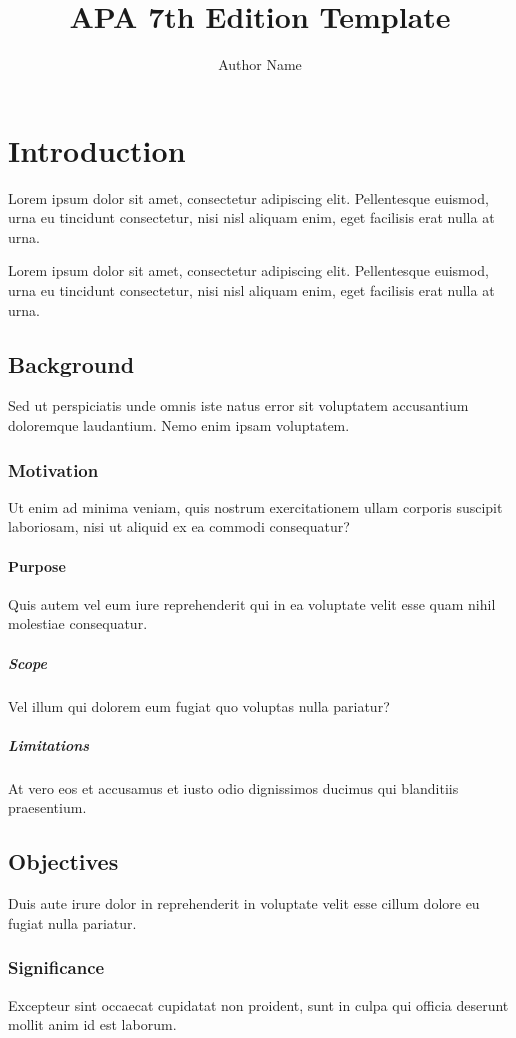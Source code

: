 \documentclass{article}
\author{Author Name}
\title{APA 7th Edition Template}
\begin{document}
\maketitle
\clearpage
\tableofcontents
\clearpage

\section{Introduction}
Lorem ipsum dolor sit amet, consectetur adipiscing elit. Pellentesque euismod, urna eu tincidunt consectetur, nisi nisl aliquam enim, eget facilisis erat nulla at urna.

Lorem ipsum dolor sit amet, consectetur adipiscing elit. Pellentesque euismod, urna eu tincidunt consectetur, nisi nisl aliquam enim, eget facilisis erat nulla at urna.

\subsection{Background}
Sed ut perspiciatis unde omnis iste natus error sit voluptatem accusantium doloremque laudantium. Nemo enim ipsam voluptatem.

\subsubsection{Motivation}
Ut enim ad minima veniam, quis nostrum exercitationem ullam corporis suscipit laboriosam, nisi ut aliquid ex ea commodi consequatur?

\paragraph{Purpose}
Quis autem vel eum iure reprehenderit qui in ea voluptate velit esse quam nihil molestiae consequatur.

\subparagraph{Scope}
Vel illum qui dolorem eum fugiat quo voluptas nulla pariatur?

\subparagraph{Limitations}
At vero eos et accusamus et iusto odio dignissimos ducimus qui blanditiis praesentium.

\subsection{Objectives}
Duis aute irure dolor in reprehenderit in voluptate velit esse cillum dolore eu fugiat nulla pariatur.

\subsubsection{Significance}
Excepteur sint occaecat cupidatat non proident, sunt in culpa qui officia deserunt mollit anim id est laborum.
\end{document}
